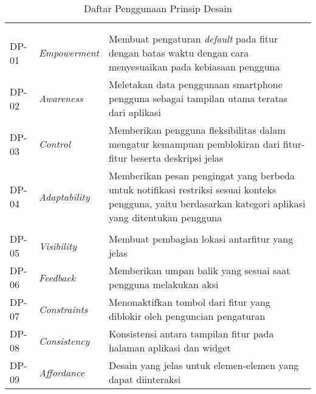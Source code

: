 \RaggedLeft
\begin{small}
\begin{longtable}[c]{|W{c}{0.07\textwidth}|>{\cccnormspacingcenter}m{0.18\textwidth}|>{\cccnormspacing}m{0.65\textwidth}|}
  \caption{Daftar Penggunaan Prinsip Desain}
  \label{tab:prinsip_desain} \\
  \hline {}
   &  &  \\ \hline \endfirsthead
  \hline {}
   &  &  \\ \hline \endhead

  \hline \endfoot
  
    \\ \hline
  DP-01 & \textit{Empowerment} & Membuat pengaturan \textit{default} pada fitur dengan batas waktu dengan cara menyesuaikan pada kebiasaan pengguna \\ \hline
  DP-02 & \textit{Awareness} & Meletakan data penggunaan smartphone pengguna sebagai tampilan utama teratas dari aplikasi \\ \hline
  DP-03 & \textit{Control} & Memberikan pengguna fleksibilitas dalam mengatur kemampuan pemblokiran dari fitur-fitur beserta deskripsi jelas \\ \hline
  DP-04 & \textit{Adaptability} & Memberikan pesan pengingat yang berbeda untuk notifikasi restriksi sesuai konteks pengguna, yaitu berdasarkan kategori aplikasi yang ditentukan pengguna \\ \hline
    \\ \hline
  DP-05 & \textit{Visibility} & Membuat pembagian lokasi antarfitur yang jelas \\ \hline
  DP-06 & \textit{Feedback} & Memberikan umpan balik yang sesuai saat pengguna melakukan aksi \\ \hline
  DP-07 & \textit{Constraints} & Menonaktifkan tombol dari fitur yang diblokir oleh penguncian pengaturan \\ \hline
  DP-08 & \textit{Consistency} & Konsistensi antara tampilan fitur pada halaman aplikasi dan widget \\ \hline
  DP-09 & \textit{Affordance} & Desain yang jelas untuk elemen-elemen yang dapat diinteraksi \\ \hline

\end{longtable}
\end{small}
\justifying
\FloatBarrier

